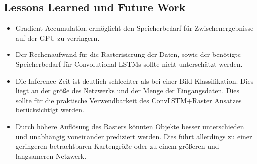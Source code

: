 \documentclass[12pt]{article}
\begin{document}
    \subsection{Lessons Learned und Future Work}
        \begin{itemize}
            \item Gradient Accumulation ermöglicht den Speicherbedarf für Zwischenergebnisse auf der GPU zu verringern.
            \item Der Rechenaufwand für die Rasterisierung der Daten, sowie der benötigte Speicherbedarf für Convolutional LSTMs sollte nicht unterschätzt werden.
            \item Die Inference Zeit ist deutlich schlechter als bei einer Bild-Klassifikation. Dies liegt an der größe des Netzwerks und der Menge der Eingangsdaten. Dies sollte für die praktische Verwendbarkeit des ConvLSTM+Raster Ansatzes berücksichtigt werden. 
            \item Durch höhere Auflösung des Rasters könnten Objekte besser unterschieden und unabhängig voneinander prediziert werden. Dies führt allerdings zu einer geringeren betrachtbaren Kartengröße oder zu einem größeren und langsameren Netzwerk.
        \end{itemize}
\pagebreak
{}

\end{document}
